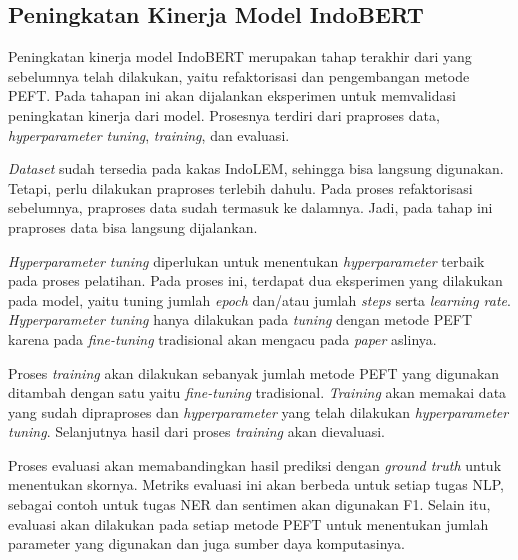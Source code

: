 \subsection{Peningkatan Kinerja Model IndoBERT}

Peningkatan kinerja model IndoBERT merupakan tahap terakhir dari yang sebelumnya telah dilakukan, yaitu refaktorisasi dan pengembangan metode PEFT. Pada tahapan ini akan dijalankan eksperimen untuk memvalidasi peningkatan kinerja dari model. Prosesnya terdiri dari praproses data, \textit{hyperparameter tuning}, \textit{training}, dan evaluasi. 

\textit{Dataset} sudah tersedia pada kakas IndoLEM, sehingga bisa langsung digunakan. Tetapi, perlu dilakukan praproses terlebih dahulu. Pada proses refaktorisasi sebelumnya, praproses data sudah termasuk ke dalamnya. Jadi, pada tahap ini praproses data bisa langsung dijalankan.

\textit{Hyperparameter tuning} diperlukan untuk menentukan \textit{hyperparameter} terbaik pada proses pelatihan. Pada proses ini, terdapat dua eksperimen yang dilakukan pada model, yaitu tuning jumlah \textit{epoch} dan/atau jumlah \textit{steps} serta \textit{learning rate}. \textit{Hyperparameter tuning} hanya dilakukan pada \textit{tuning} dengan metode PEFT karena pada \textit{fine-tuning} tradisional akan mengacu pada \textit{paper} aslinya.

Proses \textit{training} akan dilakukan sebanyak jumlah metode PEFT yang digunakan ditambah dengan satu yaitu \textit{fine-tuning} tradisional. \textit{Training} akan memakai data yang sudah dipraproses dan \textit{hyperparameter} yang telah dilakukan \textit{hyperparameter tuning}. Selanjutnya hasil dari proses \textit{training} akan dievaluasi.

Proses evaluasi akan memabandingkan hasil prediksi dengan \textit{ground truth} untuk menentukan skornya. Metriks evaluasi ini akan berbeda untuk setiap tugas NLP, sebagai contoh untuk tugas NER dan sentimen akan digunakan F1. Selain itu, evaluasi akan dilakukan pada setiap metode PEFT untuk menentukan jumlah parameter yang digunakan dan juga sumber daya komputasinya. 
